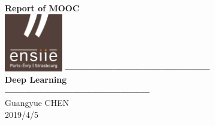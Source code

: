 \documentclass[a4paper]{article}
\begin{document}
\hypersetup{pageanchor=false,
             bookmarksnumbered=true,
             pdfencoding=unicode
            }
\begin{titlepage}
\vspace*{7cm}
\begin{center}%
{\LARGE \textbf{Report of MOOC} }\\
\vskip 1cm
\includegraphics[width=1in]{Logo_ENSIIE.png}
\vskip 1cm
{\Huge \textbf{---------------------------------------------} }\\
\vskip 0.5cm
{\Huge \textbf{Deep Learning} }\\
\vskip 0.5cm
{\Huge \textbf{---------------------------------------------} }\\
\vskip 1cm
\vspace*{1cm}
{\large Guangyue CHEN}\\
\vspace*{0.5cm}
{\large{2019/4/5}}
\end{center}
\end{titlepage}
\tableofcontents{\LARGE}
\hypersetup{pageanchor=true}


\newpage
\end{document}
